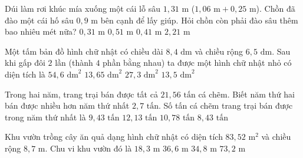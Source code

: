 \begin{ex} %
Dúi làm rơi khúc mía xuống một cái lỗ sâu $1{,}31\text{ m}$ ($1{,}06\text{ m} + 0{,}25\text{ m}$). Chồn đã đào một cái hố sâu $0{,}9\text{ m}$ bên cạnh để lấy giúp. Hỏi chồn còn phải đào sâu thêm bao nhiêu mét nữa?
\choice
{$0{,}31\text{ m}$}
{$0{,}51\text{ m}$}
{\True $0{,}41\text{ m}$}
{$2{,}21\text{ m}$}
\end{ex}

\begin{ex} %
Một tấm bản đồ hình chữ nhật có chiều dài $8{,}4\text{ dm}$ và chiều rộng $6{,}5\text{ dm}$. Sau khi gấp đôi $2$ lần (thành $4$ phần bằng nhau) ta được một hình chữ nhật nhỏ có diện tích là
\choice
{$54{,}6\text{ dm}^2$}
{\True $13{,}65\text{ dm}^2$}
{$27{,}3\text{ dm}^2$}
{$13{,}5\text{ dm}^2$}
\end{ex}

\begin{ex} %
Trong hai năm, trang trại bán được tất cả $21{,}56\text{ tấn}$ cá chẽm. Biết năm thứ hai bán được nhiều hơn năm thứ nhất $2{,}7\text{ tấn}$. Số tấn cá chẽm trang trại bán được trong năm thứ nhất là
\choice
{\True $9{,}43\text{ tấn}$}
{$12{,}13\text{ tấn}$}
{$10{,}78\text{ tấn}$}
{$8{,}43\text{ tấn}$}
\end{ex}

\begin{ex} %
Khu vườn trồng cây ăn quả dạng hình chữ nhật có diện tích $83{,}52\text{ m}^2$ và chiều rộng $8{,}7\text{ m}$. Chu vi khu vườn đó là
\choice
{$18{,}3\text{ m}$}
{\True $36{,}6\text{ m}$}
{$34{,}8\text{ m}$}
{$73{,}2\text{ m}$}
\end{ex}

